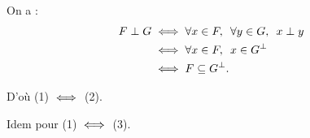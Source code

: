 \begin{dem}
On a : \[\begin{aligned}
F\perp G&\ssi\quantifs{\forall x\in F;\forall y\in G}x\perp y \\
&\ssi\quantifs{\forall x\in F}x\in G\ortho \\
&\ssi F\subset G\ortho.
\end{aligned}\]

D'où (1) \(\iff\) (2).

Idem pour (1) \(\iff\) (3).
\end{dem}

